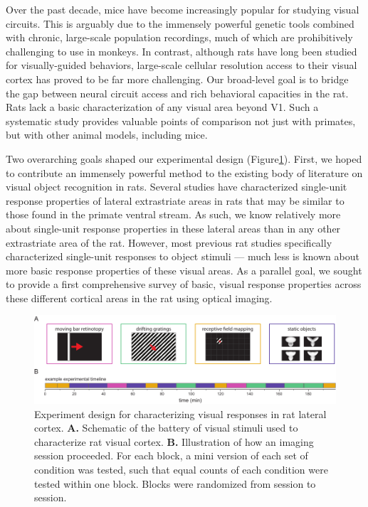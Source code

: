 Over the past decade, mice have become increasingly popular for studying visual circuits. This is arguably due to the immensely powerful genetic tools combined with chronic, large-scale population recordings, much of which are prohibitively challenging to use in monkeys. In contrast, although rats have long been studied for visually-guided behaviors, large-scale cellular resolution access to their visual cortex has proved to be far more challenging. Our broad-level goal is to bridge the gap between neural circuit access and rich behavioral capacities in the rat. Rats lack a basic characterization of any visual area beyond V1. Such a systematic study provides valuable points of comparison not just with primates, but with other animal models, including mice. 

Two overarching goals shaped our experimental design (Figure\ref{fig:experiment_design}). First, we hoped to contribute an immensely powerful method to the existing body of literature on visual object recognition in rats. Several studies have characterized single-unit response properties of lateral extrastriate areas in rats that may be similar to those found in the primate ventral stream\cite{Tafazoli2017, Vermaercke2014, VinkenX, Vermaerke2015}. As such, we know relatively more about single-unit response properties in these lateral areas than in any other extrastriate area of the rat. However, most previous rat studies specifically characterized single-unit responses to object stimuli --- much less is known about more basic response properties of these visual areas. As a parallel goal, we sought to provide a first comprehensive survey of basic, visual response properties across these different cortical areas in the rat using optical imaging. 

\begin{figure}
    \includegraphics[width=\textwidth]{figures/chapter_3/fig_3-1_experiment_design/fig_3-1_experiment_design.pdf}
    \vspace{.1in}
    \caption[Experiment design]{Experiment design for characterizing visual responses in rat lateral cortex. 
    \textbf{A.} Schematic of the battery of visual stimuli used to characterize rat visual cortex. 
    \textbf{B.} Illustration of how an imaging session proceeded. For each block, a mini version of each set of condition was tested, such that equal counts of each condition were tested within one block. Blocks were randomized from session to session. 
    \label{fig:experiment_design}}
\end{figure}

